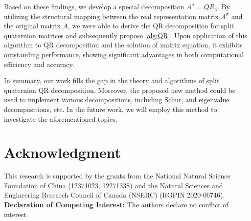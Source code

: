 \documentclass[conference]{IEEEtran}
\numberwithin{equation}{section}
\begin{document}
Based on these findings, we develop a special decomposition $A^\sigma = QR_4$. By utilizing the structural mapping between the real representation matrix $A^\sigma$ and the original matrix $A$, we were able to derive the QR decomposition for split quaternion matrices and subsequently propose \cref{alg:QR}. Upon application of this algorithm to QR decomposition and the solution of matrix equation, it exhibits outstanding performance, showing significant advantages in both computational efficiency and accuracy.

In summary, our work fills the gap in the theory and algorithms of split quaternion QR decomposition. Moreover,  the proposed new method could be used to implement various decompositions, including Schur, and eigenvalue decompositions, etc. In the future work, we will employ this method to investigate the aforementioned topics.

\section*{Acknowledgment} This research is supported by the grants from the National Natural Science Foundation of China (12371023, 12271338) and the Natural Sciences and Engineering Research Council of Canada (NSERC) (RGPIN 2020-06746). 
\iffalse
{\bf Declaration of Competing Interest:} The authors declare no conflict of interest.
\\
\end{document}
